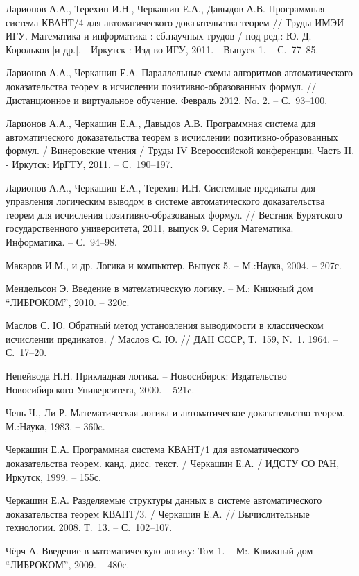 \begin{thebibliography}{99}
 Ларионов А.А., Терехин И.Н., Черкашин Е.А., Давыдов А.В. Программная система КВАНТ/4 для автоматического доказательства теорем // Труды ИМЭИ ИГУ. Математика и информатика : сб.научных трудов / под ред.: Ю. Д. Корольков [и др.]. - Иркутск : Изд-во ИГУ, 2011. - Выпуск 1. -- С.~77--85.

 Ларионов А.А., Черкашин Е.А. Параллельные схемы алгоритмов автоматического доказательства теорем в исчислении позитивно-образованных формул. // Дистанционное и виртуальное обучение. Февраль 2012. No. 2. -- С.~93--100.

 Ларионов А.А., Черкашин Е.А., Давыдов А.В. Программная система для автоматического доказательства теорем в исчислении позитивно-образованных формул. / Винеровские чтения / Труды IV Всероссийской конференции. Часть II. - Иркутск: ИрГТУ, 2011. -- С.~190--197.

 Ларионов А.А., Черкашин Е.А., Терехин И.Н. Системные предикаты для управления логическим выводом в системе автоматического доказательства теорем для исчисления позитивно-образованых формул. // Вестник Бурятского государственного университета, 2011, выпуск 9. Серия Математика. Информатика. -- С.~94--98.

 Макаров И.М., и др. Логика и компьютер. Выпуск 5. -- М.:Наука, 2004. -- 207с.

 Мендельсон Э. Введение в математическую логику. -- М.: Книжный дом ``ЛИБРОКОМ'', 2010. -- 320с.

 Маслов С. Ю. Обратный метод установления выводимости в классическом исчислении предикатов. / Маслов С. Ю. // ДАН СССР, Т.~159, N.~1. 1964. -- С.~17--20.

 Непейвода Н.Н. Прикладная логика. -- Новосибирск: Издательство Новосибирского Университета, 2000. -- 521c.

 Чень Ч., Ли Р. Математическая логика и автоматическое доказательство теорем. -- М.:Наука, 1983. -- 360c.

 Черкашин Е.А. Программная система КВАНТ/1 для автоматического доказательства теорем. канд. дисс. текст. / Черкашин Е.А. / ИДСТУ СО РАН, Иркутск, 1999. -- 155с.

 Черкашин Е.А. Разделяемые структуры данных в системе автоматического доказательства теорем КВАНТ/3. / Черкашин Е.А. // Вычислительные технологии. 2008. Т.~13. -- С.~102--107.

 Чёрч А. Введение в математическую логику: Том 1. -- М:. Книжный дом ``ЛИБРОКОМ'', 2009. -- 480с.


\end{thebibliography}
